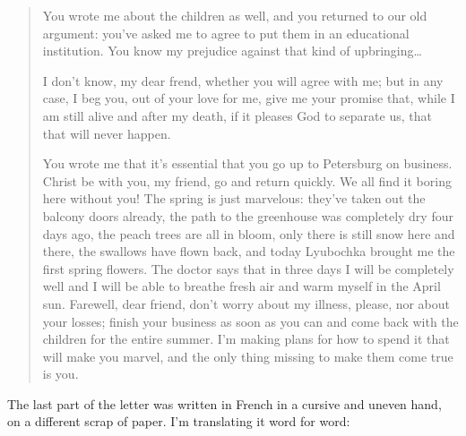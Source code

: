 \begin{quotation}
You wrote me about the children as well, and you returned to our old argument: you've asked me to agree to put them in an educational institution. You know my prejudice against that kind of upbringing\ldots{}

I don't know, my dear frend, whether you will agree with me; but in any case, I beg you, out of your love for me, give me your promise that, while I am still alive and after my death, if it pleases God to separate us, that that will never happen.

You wrote me that it's essential that you go up to Petersburg on business. Christ be with you, my friend, go and return quickly. We all find it boring here without you! The spring is just marvelous: they've taken out the balcony doors already, the path to the greenhouse was completely dry four days ago, the peach trees are all in bloom, only there is still snow here and there, the swallows have flown back, and today Lyubochka brought me the first spring flowers. The doctor says that in three days I will be completely well and I will be able to breathe fresh air and warm myself in the April sun. Farewell, dear friend, don't worry about my illness, please, nor about your losses; finish your business as soon as you can and come back with the children for the entire summer. I'm making plans for how to spend it that will make you marvel, and the only thing missing to make them come true is you.
\end{quotation}

The last part of the letter was written in French in a cursive and uneven hand, on a different scrap of paper. I'm translating it word for word:

